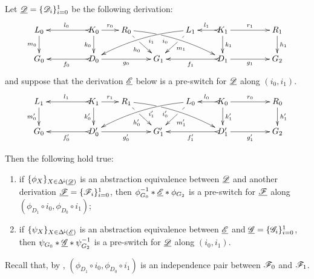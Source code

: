 \begin{lemma}\label{lem:abs}
	Let $\underline{\mathscr{D}}=\{\mathscr{D}_i\}_{i=0}^1$ be the following derivation:
	\[\xymatrix@R=20pt@C=20pt{L_0 \ar[d]_{m_0}&& K_0
		\ar[d]_{k_0}\ar@{>->}[ll]_{l_0} \ar[r]^{r_0} & R_0
		\ar@{>}@/^.25cm/[drrr]|(.32)\hole_(.4){i_0}
		\ar[dr]|(.33)\hole_{h_0} && L_1 \ar@{>}@/_.25cm/[dlll]^(.4){i_1}
		\ar[dl]|(.33)\hole^{m_1}& K_1 \ar[d]^{k_1}\ar@{>->}[l]_{l_1}
		\ar[rr]^{r_1} && R_1 \ar[d]^{h_1}\\G_0 && \ar@{>->}[ll]^{f_0}
		D_0 \ar[rr]_{g_0}&& G_1 && \ar@{>->}[ll]^{f_1} D_1
		\ar[rr]_{g_1}&& G_2}
	\]
	and suppose that the derivation $\underline{\mathscr{E}}$ below is a pre-switch for $\underline{\mathscr{D}}$ along $(i_0,i_1)$.
	\[
	\xymatrix@R=20pt@C=20pt{
		{L_1} \ar[d]_{m_0'}
		&&  {K_1} \ar@{>->}[ll]_{l_1} \ar[r]^{r_1} \ar[d]_{k_0'}
		&  {R_1} \ar[dr]|(.33)\hole_{h_0'}  \ar@/^.25cm/@{>}_(.4){i_0'}|(.32)\hole[drrr]
		& & 
		{L_0}\ar[dl]|(.33)\hole^{m_1'} \ar@/_.25cm/@{>}^(.4){i_1'}[dlll] 
		&  {K_0} \ar@{>->}[l]_{l_0} \ar[rr]^{r_0} \ar[d]^{k_1'}
		& & {R_0} \ar[d]^{h_1'} \\		
		{G_0}
		& & {D_0'} \ar@{>->}[ll]^{f_0'} \ar[rr]_{g_0'}
		& &  {G'_1} 
		& &  {D_1'} \ar@{>->}[ll]^{f_1'} \ar[rr]_{g_1'}
		& & {G_2}  }
	\]
	
	Then the following hold true:
	\begin{enumerate}
		\item if $\{\phi_X\}_{X\in \Delta^{\hspace{-1pt}\downarrow\hspace{-1pt}}(\underline{\mathscr{D}})}$ is an abstraction equivalence between $\underline{\mathscr{D}}$ and another derivation $\underline{\mathscr{F}}=\{\mathscr{F}_i\}_{i=0}^1$, then $\phi^{-1}_{G_0}*\underline{\mathscr{E}}*\phi_{G_2}$ is a pre-switch for $\underline{\mathscr{F}}$ along $(\phi_{D_1}\circ i_0, \phi_{D_0}\circ i_1 )$;
		\item if $\{\psi_X\}_{X\in \Delta^{\hspace{-1pt}\downarrow\hspace{-1pt}}(\underline{\mathscr{E}})}$ is an abstraction equivalence between $\underline{\mathscr{E}}$ and $\underline{\mathscr{G}}=\{\mathscr{G}_{i}\}_{i=0}^1$, then $\psi_{G_0}*\underline{\mathscr{G}}*\psi^{-1}_{G_2}$ is a pre-switch for $\underline{\mathscr{D}}$ along $(i_0, i_1)$.
	\end{enumerate}
	\begin{remark}Recall that, by , $(\phi_{D_1}\circ i_0, \phi_{D_0}\circ i_1 )$ is an independence pair between $\mathscr{F}_0$ and $\mathscr{F}_1$.
	\end{remark}
\end{lemma}
